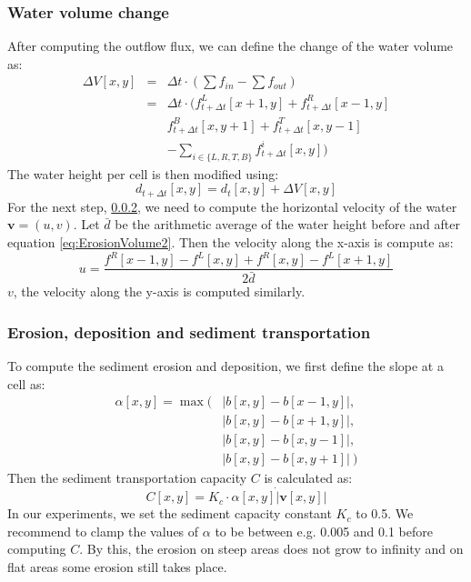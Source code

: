\documentclass[journal, letterpaper]{IEEEtran}
\begin{document}
\subsubsection{Water volume change}\label{Erosion3}
After computing the outflow flux, we can define the change of the water volume as:
\begin{equation}
\begin{array}{rcl}
	\Delta V[x,y] &=& \Delta t \cdot (\sum{f_{in}} - \sum{f_{out}}) \\
	              &=& \Delta t \cdot (f_{t+\Delta t}^L[x+1,y] + f_{t+\Delta t}^R[x-1,y] \\
								& & f_{t+\Delta t}^B[x,y+1] + f_{t+\Delta t}^T[x,y-1] \\
								& & - \sum_{i\in\{L,R,T,B\}}{f_{t+\Delta t}^i[x,y]} )
\end{array}
\label{eq:ErosionVolume1}
\end{equation}
The water height per cell is then modified using:
\begin{equation}
	d_{t+\Delta t}[x,y] = d_t[x,y] + \Delta V[x,y]
\label{eq:ErosionVolume2}
\end{equation}
For the next step, \ref{ErosionDeposition}, we need to compute the horizontal velocity of the water $\textbf{v}=(u,v)$.
Let $\bar{d}$ be the arithmetic average of the water height before and after equation \ref{eq:ErosionVolume2}.
Then the velocity along the x-axis is compute as:
\begin{equation}
	u = \frac{f^R[x-1,y]-f^L[x,y] + f^R[x,y]-f^L[x+1,y]}{2\bar{d}}
\label{eq:ErosionVolume3}
\end{equation}
$v$, the velocity along the y-axis is computed similarly.

\subsubsection{Erosion, deposition and sediment transportation}\label{ErosionDeposition}
To compute the sediment erosion and deposition, we first define the slope at a cell as:
\begin{equation}
\begin{array}{rl}
	\alpha[x,y] = \max(&|b[x,y]-b[x-1,y]|,\\
	                   &|b[x,y]-b[x+1,y]|,\\
										 &|b[x,y]-b[x,y-1]|,\\
										 &|b[x,y]-b[x,y+1]|\ )
\end{array}
\label{eq:ErosionSediment1}
\end{equation}
Then the sediment transportation capacity $C$ is calculated as:
\begin{equation}
	C[x,y]=K_c \cdot \alpha[x,y] \dot |\textbf{v}[x,y]|
\label{eq:ErosionSediment2}
\end{equation}
In our experiments, we set the sediment capacity constant $K_c$ to 0.5.
We recommend to clamp the values of $\alpha$ to be between e.g. 0.005 and 0.1 before computing $C$. By this, the erosion on steep areas does not grow to infinity and on flat areas some erosion still takes place.
\end{document}
